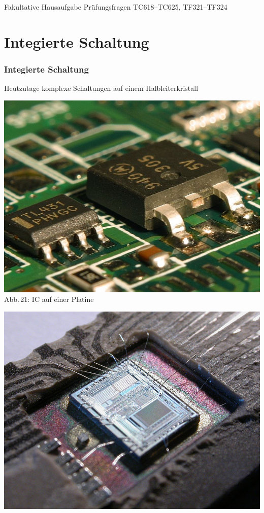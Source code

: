 \begin{frame}
  \begin{exampleblock}{Fakultative Hausaufgabe}
    Prüfungsfragen TC618--TC625, TF321--TF324
  \end{exampleblock}
\end{frame}

\section*{Integierte Schaltung}
\begin{frame}
  \frametitle{Integierte Schaltung}
  Heutzutage komplexe Schaltungen auf einem Halbleiterkristall
  \begin{minipage}{0.3\textwidth}
    \includegraphics[width=\textwidth,height=.6\textheight,keepaspectratio]{a06/IC.jpg}\\
    {\tiny Abb.\,21: IC auf einer Platine~\cite{wp}}
  \end{minipage}
  \hspace{0.5cm}
  \begin{minipage}{0.5\textwidth}
    \begin{center}
      \includegraphics[width=\textwidth,height=.6\textheight,keepaspectratio]{a06/IC2.jpg}\\

\end{center}
\end{minipage}
\end{frame}
